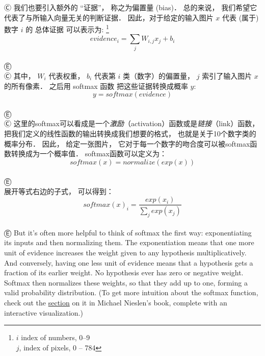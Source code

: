 Ⓒ 我们也要引入额外的 ``证据''， 称之为偏置量 (bias)．  总的来说， 我们希望它代表了与所输入向量无关的判断证据．  因此，对于给定的输入图片 $x$ 代表 (属于) 数字 $i$ 的 总体证据 可以表示为:
\footnote{ $i$ index of numbers, 0--9 \\
$j$, index of pixels, 0 -- 784}
\begin{equation}
\label{eq.evidence_i}
evidence_i = \sum_j{W_{i,j}}x_j+b_i
\end{equation}\\
Ⓔ \\
Ⓒ 其中， $W_i$ 代表权重， $b_i$ 代表第 $i$ 类（数字）的偏置量， $j$ 索引了输入图片 $x$ 的所有像素．  之后用 softmax 函数 把这些证据转换成概率 $y$:\\
\begin{equation}
y = softmax(evidence)
\end{equation}\\
Ⓔ \\
Ⓒ 这里的softmax可以看成是一个\emph{激励}（activation）函数或是\emph{链接}（link）函数， 把我们定义的线性函数的输出转换成我们想要的格式， 也就是关于10个数字类的概率分布．  因此， 给定一张图片， 它对于每一个数字的吻合度可以被softmax函数转换成为一个概率值．  softmax函数可以定义为：\\
\begin{equation}
\label{eq.softmax}
softmax(x) = normalize(exp(x))
\end{equation}\\
Ⓔ \\
展开等式右边的子式， 可以得到：\\
\begin{equation}
softmax(x)_i = \frac{exp(x_i)}{\sum_j{exp(x_j)}}
\end{equation}\\
Ⓔ But it's often more helpful to think of softmax the first way: exponentiating its inputs and then normalizing them. The exponentiation means that one more unit of evidence increases the weight given to any hypothesis multiplicatively. And conversely, having one less unit of evidence means that a hypothesis gets a fraction of its earlier weight. No hypothesis ever has zero or negative weight. Softmax then normalizes these weights, so that they add up to one, forming a valid probability distribution. (To get more intuition about the softmax function, check out the \href{http://neuralnetworksanddeeplearning.com/chap3.html#softmax}{section} on it in Michael Nieslen's book, complete with an interactive visualization.)\\
